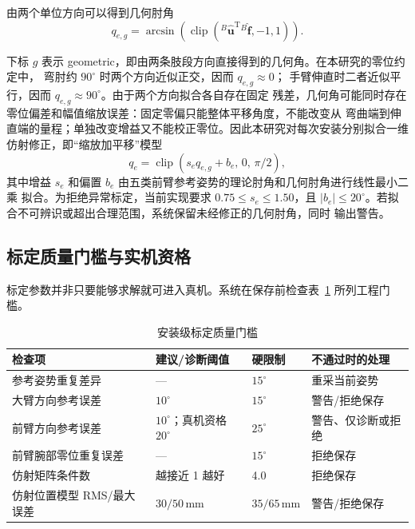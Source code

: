 由两个单位方向可以得到几何肘角
\begin{equation}
  q_{e,g}=\arcsin\left(
  \operatorname{clip}
  ( {}^{B}\hat{\boldsymbol u}^{\mathrm T}
  {}^{B}\hat{\boldsymbol f},-1,1)
  \right).
  \label{eq:ch4_geometric_elbow_angle}
\end{equation}

下标 $g$ 表示 geometric，即由两条肢段方向直接得到的几何角。在本研究的零位约定中，
弯肘约 $90^\circ$ 时两个方向近似正交，因而 $q_{e,g}\approx0$；
手臂伸直时二者近似平行，因而 $q_{e,g}\approx90^\circ$。由于两个方向拟合各自存在固定
残差，几何角可能同时存在零位偏差和幅值缩放误差：固定零偏只能整体平移角度，不能改变从
弯曲端到伸直端的量程；单独改变增益又不能校正零位。因此本研究对每次安装分别拟合一维
仿射修正，即“缩放加平移”模型
\begin{equation}
  q_e=\operatorname{clip}
  (s_e q_{e,g}+b_e,\,0,\,\pi/2),
  \label{eq:ch4_elbow_affine_correction}
\end{equation}
其中增益 $s_e$ 和偏置 $b_e$ 由五类前臂参考姿势的理论肘角和几何肘角进行线性最小二乘
拟合。为拒绝异常标定，当前实现要求 $0.75\leq s_e\leq1.50$，且
$|b_e|\leq20^\circ$。若拟合不可辨识或超出合理范围，系统保留未经修正的几何肘角，同时
输出警告。

\subsection{标定质量门槛与实机资格}
\label{subsec:ch4_calibration_quality_gates}

标定参数并非只要能够求解就可进入真机。系统在保存前检查表~\ref{tab:ch4_quality_gates}
所列工程门槛。
\begin{table}[htbp]
  \centering
  \caption{安装级标定质量门槛}
  \label{tab:ch4_quality_gates}
  \begin{tabularx}{\linewidth}{@{}XllX@{}}
    \toprule
    检查项 & 建议/诊断阈值 & 硬限制 & 不通过时的处理 \\
    \midrule
    参考姿势重复差异 & --- & $15^\circ$ & 重采当前姿势 \\
    大臂方向参考误差 & $10^\circ$ & $15^\circ$ & 警告/拒绝保存 \\
    前臂方向参考误差 & $10^\circ$；真机资格 $20^\circ$ & $25^\circ$ & 警告、仅诊断或拒绝 \\
    前臂腕部零位重复误差 & --- & $15^\circ$ & 拒绝保存 \\
    仿射矩阵条件数 & 越接近 1 越好 & 4.0 & 拒绝保存 \\
    仿射位置模型 RMS/最大误差 & $30/50\,\mathrm{mm}$ & $35/65\,\mathrm{mm}$ & 警告/拒绝保存 \\
    \bottomrule
  \end{tabularx}
\end{table}

